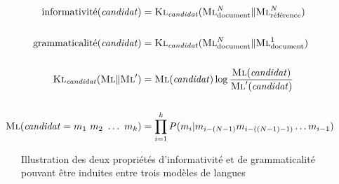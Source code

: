         \begin{align}
          \text{informativité}(\text{\textit{candidat}}) &= \textsc{Kl}_{\text{\textit{candidat}}}(\textsc{Ml}_{\text{document}}^{N} \| \textsc{Ml}_{\text{référence}}^{N}) \label{math:informativeness}\\
          \notag\\
          \text{grammaticalité}(\text{\textit{candidat}}) &= \textsc{Kl}_{\text{\textit{candidat}}}(\textsc{Ml}_{\text{document}}^{N} \| \textsc{Ml}_{\text{document}}^{1}) \label{math:phraseness}\\
          \notag\\
          \textsc{Kl}_{\text{\textit{candidat}}}(\textsc{Ml} \| \textsc{Ml}') &= \textsc{Ml}(\text{\textit{candidat}}) \log \frac{\textsc{Ml}(\text{\textit{candidat}})}{\textsc{Ml}'(\text{\textit{candidat}})} \label{math:kullbackleibler}\\
          \notag\\
          \textsc{Ml}(\text{\textit{candidat}} = m_1\ m_2\ \dots\ m_k) &= \prod_{i = 1}^k P(m_i | m_{i - (N - 1)} m_{i - ((N - 1) - 1)} \dots m_{i - 1}) \notag
        \end{align}
        \begin{figure}
          \centering


          \caption{Illustration des deux propriétés d'informativité et de
                   grammaticalité pouvant être induites entre trois modèles de
                   langues~\cite{tomokiyo2003languagemodel}
                   \label{fig:klml}}
        \end{figure}

